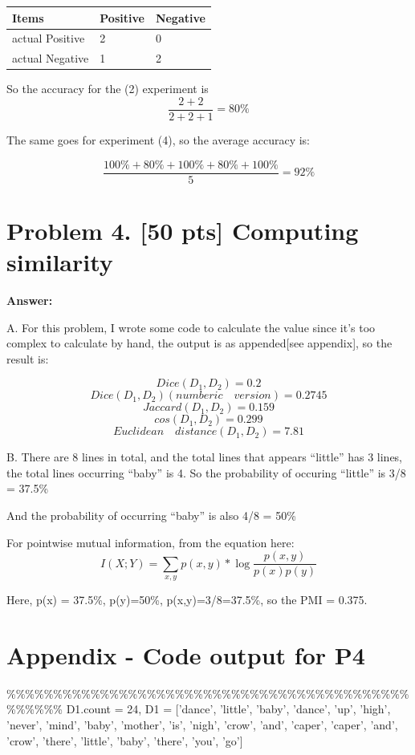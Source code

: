 \documentclass{article}
\begin{document}
\begin{center}
    \begin{tabular}{| l | l | l |}
    \hline
    Items & Positive & Negative \\ \hline
    actual Positive & 2 & 0  \\ \hline
    actual Negative & 1 & 2  \\ \hline
    \end{tabular}
\end{center}

So the accuracy for the (2) experiment is $$\frac{2+2}{2+2+1} = 80\%$$

The same goes for experiment (4), so the average accuracy is:

$$\frac{100\% + 80\% + 100\% + 80\% + 100\%}{5} = 92\%$$


\section{Problem 4. [50 pts] Computing similarity}

\textbf{Answer:}

A. For this problem, I wrote some code to calculate the value since it's too complex to calculate by hand, the output is as appended[see appendix], so the result is:

$$Dice(D_1, D_2) = 0.2$$
$$Dice(D_1, D_2)(numberic \quad version) = 0.2745$$
$$Jaccard(D_1, D_2) = 0.159$$
$$cos(D_1, D_2) = 0.299$$
$$Euclidean \quad distance(D_1, D_2) = 7.81$$

B. There are 8 lines in total, and the total lines that appears ``little'' has 3 lines, the total lines occurring ``baby'' is 4. So the probability of occuring ``little'' is 3/8 = 37.5\%

And the probability of occurring ``baby'' is also 4/8 = 50\%

For pointwise mutual information, from the equation here:
$$I(X;Y) = \sum_{x,y}{p(x,y) * \log{\frac{p(x,y)}{p(x)p(y)}}}$$

Here, p(x) = 37.5\%, p(y)=50\%, p(x,y)=3/8=37.5\%, so the PMI = 0.375. 

\section{Appendix - Code output for P4}
\%\%\%\%\%\%\%\%\%\%\%\%\%\%\%\%\%\%\%\%\%\%\%\%\%\%\%\%\%\%\%\%\%\%\%\%\%\%\%\%\%\%\%\%\%\%\%\%\%
D1.count = 24, D1 = ['dance', 'little', 'baby', 'dance', 'up', 'high', 'never', 'mind', 'baby', 'mother', 'is', 'nigh', 'crow', 'and', 'caper', 'caper', 'and', 'crow', 'there', 'little', 'baby', 'there', 'you', 'go'] \\
\end{document}
